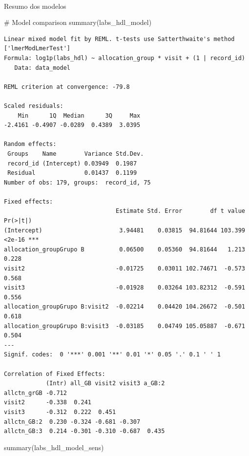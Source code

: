\documentclass[
  12pt,
]{article}
\makeatletter
\let\oldparagraph\paragraph
\renewcommand{\paragraph}{
    \@ifstar
      \xxxParagraphStar
      \xxxParagraphNoStar
  }
\newcommand{\xxxParagraphStar}[1]{\oldparagraph*{#1}\mbox{}}
\newcommand{\xxxParagraphNoStar}[1]{\oldparagraph{#1}\mbox{}}
\newenvironment{Shaded}{\begin{snugshade}}{\end{snugshade}}
\newcommand{\CommentTok}[1]{\textcolor[rgb]{0.37,0.37,0.37}{#1}}
\newcommand{\FunctionTok}[1]{\textcolor[rgb]{0.28,0.35,0.67}{#1}}
\newcommand{\NormalTok}[1]{\textcolor[rgb]{0.00,0.23,0.31}{#1}}
\makeatother
\begin{document}
\paragraph{Resumo dos modelos}\label{resumo-dos-modelos-6}

\begin{Shaded}
\begin{Highlighting}[]
\CommentTok{\# Model comparison}
\FunctionTok{summary}\NormalTok{(labs\_hdl\_model)}
\end{Highlighting}
\end{Shaded}

\begin{verbatim}
Linear mixed model fit by REML. t-tests use Satterthwaite's method ['lmerModLmerTest']
Formula: log1p(labs_hdl) ~ allocation_group * visit + (1 | record_id)
   Data: data_model

REML criterion at convergence: -79.8

Scaled residuals: 
    Min      1Q  Median      3Q     Max 
-2.4161 -0.4907 -0.0289  0.4389  3.0395 

Random effects:
 Groups    Name        Variance Std.Dev.
 record_id (Intercept) 0.03949  0.1987  
 Residual              0.01437  0.1199  
Number of obs: 179, groups:  record_id, 75

Fixed effects:
                                Estimate Std. Error        df t value Pr(>|t|)    
(Intercept)                      3.94481    0.03815  94.81644 103.399   <2e-16 ***
allocation_groupGrupo B          0.06500    0.05360  94.81644   1.213    0.228    
visit2                          -0.01725    0.03011 102.74671  -0.573    0.568    
visit3                          -0.01928    0.03264 103.82312  -0.591    0.556    
allocation_groupGrupo B:visit2  -0.02214    0.04420 104.26672  -0.501    0.618    
allocation_groupGrupo B:visit3  -0.03185    0.04749 105.05887  -0.671    0.504    
---
Signif. codes:  0 '***' 0.001 '**' 0.01 '*' 0.05 '.' 0.1 ' ' 1

Correlation of Fixed Effects:
            (Intr) all_GB visit2 visit3 a_GB:2
allctn_grGB -0.712                            
visit2      -0.338  0.241                     
visit3      -0.312  0.222  0.451              
allctn_GB:2  0.230 -0.324 -0.681 -0.307       
allctn_GB:3  0.214 -0.301 -0.310 -0.687  0.435
\end{verbatim}

\begin{Shaded}
\begin{Highlighting}[]
\FunctionTok{summary}\NormalTok{(labs\_hdl\_model\_sens)}
\end{Highlighting}
\end{Shaded}
\end{document}
